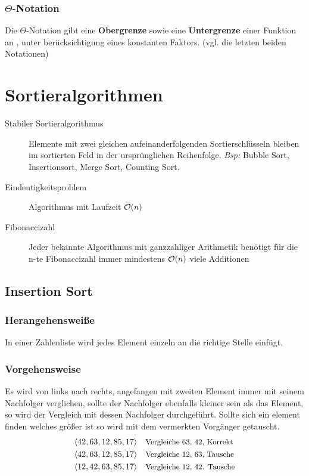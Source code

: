 \documentclass[10pt,a4paper]{article}
\begin{document}
\begin{multicols*}{4}
\subsubsection*{\(\Theta\)-Notation}
Die \(\Theta\)-Notation gibt eine \textbf{Obergrenze} sowie eine \textbf{Untergrenze} einer Funktion an , unter
berücksichtigung eines konstanten Faktors. (vgl. die letzten beiden Notationen)

\section{Sortieralgorithmen}
\begin{description}
	\item[Stabiler Sortieralgorithmus] Elemente mit zwei gleichen aufeinanderfolgenden Sortierschlüsseln bleiben im
	      sortierten Feld in der ursprünglichen Reihenfolge. \textit{Bsp:} Bubble Sort, Insertionsort, Merge Sort,
	      Counting Sort.
	\item[Eindeutigkeitsproblem] Algorithmus mit Laufzeit \(\mathcal{O}(n)\)
	\item[Fibonaccizahl] Jeder bekannte Algorithmus mit ganzzahliger Arithmetik benötigt für die n-te Fibonaccizahl
	      immer mindestens \(\mathcal{O}(n)\) viele Additionen
\end{description}

\subsection{Insertion Sort}
\subsubsection*{Herangehensweiße}
In einer Zahlenliste wird jedes Element einzeln an die richtige Stelle einfügt.
\subsubsection*{Vorgehensweise}
Es wird von links nach rechts, angefangen mit zweiten Element immer mit seinem Nachfolger verglichen, sollte der
Nachfolger ebenfalls kleiner sein als das Element, so wird der Vergleich mit dessen Nachfolger durchgeführt.
Sollte sich ein element finden welches größer ist so wird mit dem vermerkten Vorgänger getauscht.
\begin{align*}
	\langle42,63,12,85,17\rangle & \quad\text{\small Vergleiche 63, 42, Korrekt} \\
	\langle42,63,12,85,17\rangle & \quad\text{\small Vergleiche 12, 63, Tausche} \\
	\langle12,42,63,85,17\rangle & \quad\text{\small Vergleiche 12, 42. Tausche}
\end{align*}

\end{multicols*}
\end{document}
